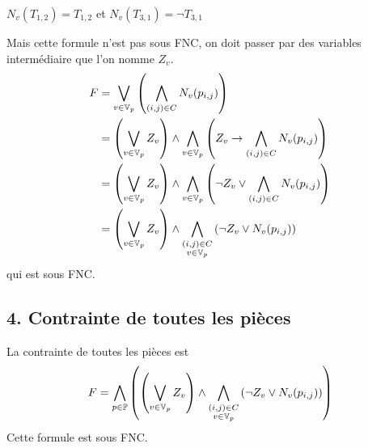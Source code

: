     $N_v(T_{1,2}) = T_{1,2}$ et $N_v(T_{3,1}) = \lnot T_{3,1}$
    
    Mais cette formule n'est pas sous FNC,
    on doit passer par des variables intermédiaire que l'on nomme $Z_v$.
    \begin{align*}
        F &= \bigvee_{v\in\mathbb{V}_p} \left( \bigwedge_{(i,j)\in C} N_v(p_{i,j}) \right)\\
        &= \left( \bigvee_{v\in\mathbb{V}_p} Z_v \right) \land \bigwedge_{v\in\mathbb{V}_p} \left(Z_v \to \bigwedge_{(i,j)\in C} N_v(p_{i,j}) \right)\\
        &= \left( \bigvee_{v\in\mathbb{V}_p} Z_v \right) \land \bigwedge_{v\in\mathbb{V}_p} \left(\lnot Z_v \lor \bigwedge_{(i,j)\in C} N_v(p_{i,j}) \right)\\
        &= \left( \bigvee_{v\in\mathbb{V}_p} Z_v \right) \land \bigwedge_{\substack{(i,j)\in C\\v\in\mathbb{V}_p}} \left(\lnot Z_v \lor N_v(p_{i,j}) \right)\\
    \end{align*}
    qui est sous FNC.
    
    \subsection*{4. Contrainte de toutes les pièces}
    La contrainte de toutes les pièces est
    \[F = \bigwedge_{p\in\mathbb{P}} \left(\left( \bigvee_{v\in\mathbb{V}_p} Z_v \right) \land
        \bigwedge_{\substack{(i,j)\in C\\v\in\mathbb{V}_p}} \left(\lnot Z_v \lor N_v(p_{i,j}) \right)\right)\]
    Cette formule est sous FNC.
    


